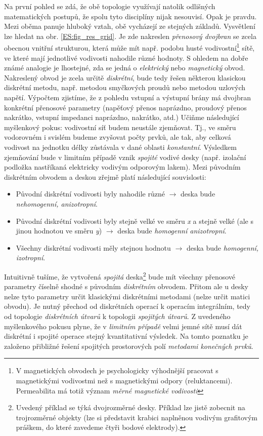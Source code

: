   Na první pohled se zdá, že obě topologie využívají natolik odlišných matematických postupů, že
  spolu tyto disciplíny nijak nesouvisí. Opak je pravdu. Mezi oběma panuje hluboký vztah, obě
  vycházejí ze stejných základů. Vysvětlení lze hledat na obr. \ref{ES:fig_res_grid}. Je zde
  nakreslen \emph{přenosový dvojbran} se zcela obecnou vnitřní strukturou, která může mít např.
  podobu husté vodivostní\footnote{V magnetických obvodech je psychologicky výhodnější pracovat s
  magnetickými vodivostmi než s magnetickými odpory (reluktancemi). Permeabilita má totiž význam
  \emph{měrné magnetické vodivosti}} sítě, ve které mají jednotlivé vodivosti nahodile různé
  hodnoty. S ohledem na dobře známé analogie je lhostejné, zda se jedná o \emph{elektrický} nebo
  \emph{magnetický} obvod. Nakreslený obvod je zcela určitě \emph{diskrétní}, bude tedy řešen
  některou klasickou diskrétní metodu, např. metodou smyčkových proudů nebo metodou uzlových
  napětí. Výpočtem zjistíme, že z pohledu vstupní a výstupní brány má dvojbran konkrétní přenosové
  parametry (napěťový přenos naprázdno, proudový přenos nakrátko, vstupní impedanci naprázdno,
  nakrátko, atd.) Učiňme následující myšlenkový pokus: vodivostní síť budem neustále zjemňovat.
  Tj., ve směru vodorovném i svislém budeme zvyšovat počty prvků, ale tak, aby celková vodivost na
  jednotku délky zůstávala v dané oblasti \emph{konstantní}. Výsledkem zjemňování bude v limitním
  případě vznik \emph{spojité} vodivé desky (např. izolační podložka nastříkaná elektricky vodivým
  odporovým lakem). Mezi původním diskrétním obvodem a deskou zřejmě platí následující souvislosti:
  \begin{itemize}[noitemsep]
    \item Původní diskrétní vodivosti byly nahodile různé \(\longrightarrow\) deska bude
          \emph{nehomogenní, anizotropní}.
    \item Původní diskrétní vodivosti byly stejně velké ve směru \emph{x} a stejně velké (ale s
          jinou hodnotou ve směru \emph{y}) \(\longrightarrow\) deska bude \emph{homogenní
          anizotropní}.
    \item Všechny diskrétní vodivosti měly stejnou hodnotu \(\longrightarrow\) deska bude
          \emph{homogenní, izotropní}.
  \end{itemize}
  
  Intuitivně tušíme, že vytvořená \emph{spojitá} deska\footnote{Uvedený příklad se týká
  dvojrozměrné desky. Příklad lze jistě zobecnit na trojrozměrné objekty (lze si představit
  krabici naplněnou vodivým grafitovým práškem, do které zavedeme čtyři bodové elektrody).} bude mít
  všechny přenosové parametry číselně shodné s původním \emph{diskrétním} obvodem. Přitom ale u
  desky nelze tyto parametry určit klasickými diskrétními metodami (nelze určit matici obvodu). Je
  nutný přechod od diskrétních operací k operacím integrálním, tedy od topologie \emph{diskrétních
  útvarů} k topologii \emph{spojitých útvarů}. Z uvedeného myšlenkového pokusu plyne, že v
  \emph{limitním případě} velmi jemné sítě musí dát diskrétní i spojité operace stejný kvantitativní
  výsledek. Na tomto poznatku je založeno přibližné řešení spojitých prostorových polí
  \emph{metodami konečných prvků}.
  
